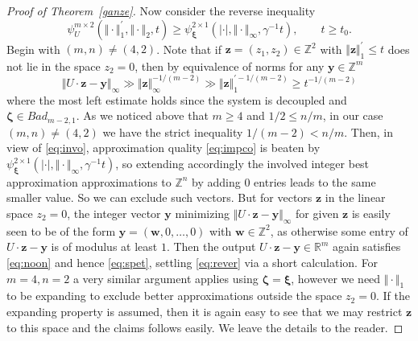 \documentclass[10pt]{amsart}
\theoremstyle{definition}
\newcommand{\ux}{\boldsymbol{\xi}}
\newcommand{\uz}{\boldsymbol{\zeta}}
\newcommand{\R}{\mathbb{R}}
\newcommand{\Z}{\mathbb{Z}}
\begin{document}
\begin{proof}[Proof of Theorem~\ref{ganze}]
    
    Now consider the reverse inequality 
    \begin{equation} \label{eq:rever}
    \psi_U^{m\times 2}(\Vert\cdot\Vert_1^{\prime}, \Vert\cdot\Vert_2,t) \ge \psi_{\ux}^{2\times 1}(|\cdot |,\Vert \cdot\Vert_{\infty},\gamma^{-1} t), \qquad t\geq t_{0}.
    \end{equation}
    Begin with $(m,n)\ne (4,2)$.
    Note that if $\boldsymbol{z}=(z_1,z_2)\in \mathbb{Z}^2$ with $\Vert \boldsymbol{z}\Vert_{1}^{\prime} \le t$ does
    not lie in the space $z_2=0$,
    then by equivalence of norms
    for any $\textbf{y}\in\mathbb{Z}^m$
    \begin{equation} \label{eq:impco}
    \Vert U\cdot \boldsymbol{z}- \boldsymbol{y}
    \Vert_{\infty}%
    \gg \Vert\boldsymbol{z}\Vert_{\infty}^{-1/(m-2)}\gg \Vert\boldsymbol{z}\Vert_{1}^{\prime -1/(m-2)}\ge t^{-1/(m-2)}
    \end{equation}
    where the most left estimate holds
    since
    the system is decoupled and 
    $\uz\in Bad_{m-2,1}$. As we noticed above that $m\ge 4$ and $1/2\le n/m$, in our case $(m,n)\ne (4,2)$ we have
    the strict inequality $1/(m-2)< n/m$. Then, in view of \eqref{eq:invo}, 
    approximation quality \eqref{eq:impco}
    is beaten by $\psi_{\ux}^{2\times 1}(|\cdot |,\Vert \cdot\Vert_{\infty},\gamma^{-1} t)$, so extending accordingly
    the involved integer best approximation approximations
    to $\Z^n$ by adding $0$ entries 
    leads to the same smaller value. So we can exclude
    such vectors. But for vectors $\boldsymbol{z}$ in the linear space $z_2=0$,
    the integer
    vector $\textbf{y}$ minimizing 
    $\Vert U\cdot \textbf{z}-\textbf{y}\Vert_{\infty}$
    for given $\textbf{z}$ is easily seen to be of the form
    $\textbf{y}=(\textbf{w},0,\ldots,0)$ with $\textbf{w}\in\mathbb{Z}^2$, as otherwise some entry of $U\cdot \textbf{z}-\textbf{y}$ is of modulus at least $1$. Then the
    output $U\cdot \textbf{z}-\textbf{y}\in \R^m$ again satisfies \eqref{eq:noon} and hence \eqref{eq:spet}, settling \eqref{eq:rever} via a short calculation. For $m=4, n=2$ a very similar argument applies
    using $\uz=\ux$, however we need
    $\Vert\cdot\Vert_1$ to be expanding to exclude
    better approximations outside
    the space $z_2=0$. If
    the expanding property is assumed, then it is again easy to see that we may restrict $\textbf{z}$ to
    this space and the claims follows easily. We leave the details to the reader.



\end{proof}
\end{document}
